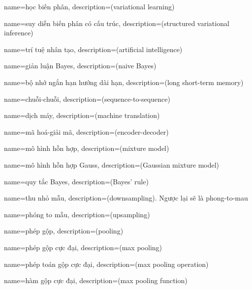 {
    name={học biến phân},
    description={(variational learning)}
}

{
    name={suy diễn biến phân có cấu trúc},
    description={(structured variational inference)}
}

{
    name={trí tuệ nhân tạo},
    description={(artificial intelligence)}
}

{
    name={giản luận Bayes},
    description={(naive Bayes)}
}

{
    name={bộ nhớ ngắn hạn hướng dài hạn},
    description={(long short-term memory)}
}


{
    name={chuỗi-chuỗi},
    description={(sequence-to-sequence)}
}

{
    name={dịch máy},
    description={(machine translation)}
}

{
    name={mã hoá-giải mã},
    description={(encoder-decoder)}
}

{
    name={mô hình hỗn hợp},
    description={(mixture model)}
}

{
    name={mô hình hỗn hợp Gauss},
    description={(Gaussian mixture model)}
}

{
    name={quy tắc Bayes},
    description={(Bayes' rule)}
}

{
    name={thu nhỏ mẫu},
    description={(downsampling). Ngược lại sẽ là \gls{phong-to-mau}}
}

{
    name={phóng to mẫu},
    description={(upsampling)}
}

{
    name={phép gộp},
    description={(pooling)}
}

{
    name={phép gộp cực đại},
    description={(max pooling)}
}

{
    name={phép toán gộp cực đại},
    description={(max pooling operation)}
}

{
    name={hàm gộp cực đại},
    description={(max pooling function)}
}

